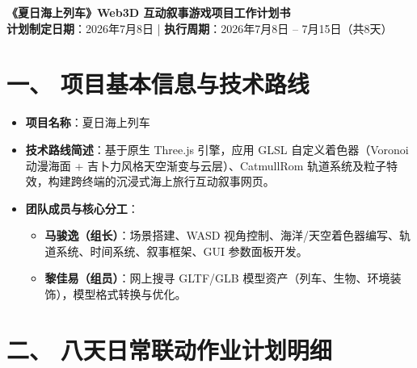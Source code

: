 \documentclass[11pt, a4paper]{article}
\begin{document}
\begin{center}
    {\LARGE \textbf{《夏日海上列车》Web3D 互动叙事游戏项目工作计划书}} \\
    \vspace{0.3cm}
    \small \textbf{计划制定日期}：2026年7月8日 \quad | \quad \textbf{执行周期}：2026年7月8日 -- 7月15日（共8天）
\end{center}

\vspace{0.2cm}

\section*{一、 项目基本信息与技术路线}
\begin{itemize}
    \item \textbf{项目名称}：夏日海上列车
    \item \textbf{技术路线简述}：基于原生 Three.js 引擎，应用 GLSL 自定义着色器（Voronoi 动漫海面 + 吉卜力风格天空渐变与云层）、CatmullRom 轨道系统及粒子特效，构建跨终端的沉浸式海上旅行互动叙事网页。
    \item \textbf{团队成员与核心分工}：
    \begin{itemize}
        \item \textbf{马骏逸（组长）}：场景搭建、WASD 视角控制、海洋/天空着色器编写、轨道系统、时间系统、叙事框架、GUI 参数面板开发。
        \item \textbf{黎佳易（组员）}：网上搜寻 GLTF/GLB 模型资产（列车、生物、环境装饰），模型格式转换与优化。
    \end{itemize}
\end{itemize}

\section*{二、 八天日常联动作业计划明细}
\end{document}
